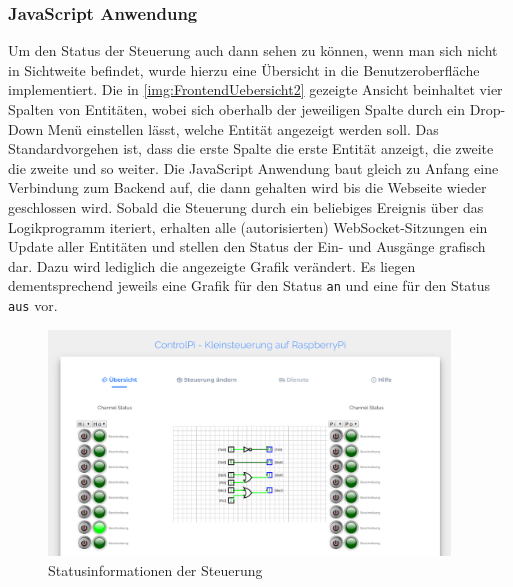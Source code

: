 \subsubsection{JavaScript Anwendung}\label{chp:ums:JavaScriptFront}
Um den Status der Steuerung auch dann sehen zu können, wenn man sich nicht in Sichtweite befindet, wurde hierzu eine Übersicht in die Benutzeroberfläche implementiert. Die in \autoref{img:FrontendUebersicht2} gezeigte Ansicht beinhaltet vier Spalten von Entitäten, wobei sich oberhalb der jeweiligen Spalte durch ein Drop-Down Menü einstellen lässt, welche Entität angezeigt werden soll. Das Standardvorgehen ist, dass die erste Spalte die erste Entität anzeigt, die zweite die zweite und so weiter. Die JavaScript Anwendung baut gleich zu Anfang eine Verbindung zum Backend auf, die dann gehalten wird bis die Webseite wieder geschlossen wird. Sobald die Steuerung durch ein beliebiges Ereignis über das Logikprogramm iteriert, erhalten alle (autorisierten) WebSocket-Sitzungen ein Update aller Entitäten und stellen den Status der Ein- und Ausgänge grafisch dar. Dazu wird lediglich die angezeigte Grafik verändert. Es liegen dementsprechend jeweils eine Grafik für den Status \texttt{an} und eine für den Status \texttt{aus} vor. 

 \begin{figure}[H]
	\begin{center}
		\includegraphics[width=0.95\textwidth]{./images/FrontendUebersicht.png}
		\caption{Statusinformationen der Steuerung}
		\label{img:FrontendUebersicht2}
	\end{center} 
\end{figure}


